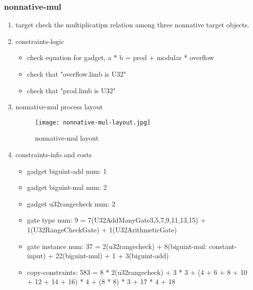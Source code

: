 \subsubsection{nonnative-mul}
\label{nonnative-mul}

\begin{enumerate}
    \item target
        check the multiplicatipn relation among three nonnative target objects.
    \item constraints-logic
        \begin{itemize}
            \item check equation for gadget,  a * b = prod + modular * overflow
            \item check that "overflow.limb is U32"
            \item check that "prod.limb is U32"
        \end{itemize}
    \item nonnative-mul process layout
        \begin{figure}[!ht]
            \centering
            \texttt{[image: nonnative-mul-layout.jpg]}
            \caption{nonnative-mul layout}
            \label{fig:nonnative-mul-layout}
        \end{figure}
    
    \item constraints-info and costs
        \begin{itemize}
            \item gadget biguint-add num: 1
            \item gadget biguint-mul num: 2
            \item gadget u32rangecheck num: 2
            \item gate type num: 9 = 7(U32AddManyGate{3,5,7,9,11,13,15}) + 1(U32RangeCheckGate) + 1(U32ArithmeticGate)
            \item gate instance num: 37 = 2(u32rangecheck) + 8(biguint-mul: constant-input) + 22(biguint-mul) + 1 + 3(biguint-add)
            \item copy-constraints: 583 = 8 * 2(u32rangecheck) + 3 * 3 + (4 + 6 + 8 + 10 + 12 + 14 + 16) * 4 + (8 * 8) * 3 + 17 * 4 + 18
        \end{itemize}

\end{enumerate}